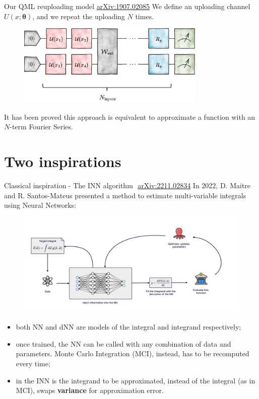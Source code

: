 \documentclass[8pt, xcolor={svgnames}, hyperref={linkcolor=black}]{beamer}
\begin{document}
\begin{frame}{Our QML reuploading model\hfill \faBook\,\,\href{https://arxiv.org/abs/1907.02085}{arXiv:1907.02085}}
We define an uploading channel $U(x; \bm{\theta})$, and we repeat the uploading 
$N$ times.
\pause 

\begin{figure}  
    \includegraphics[width=0.8\textwidth]{figures/4dim.png}
\end{figure}
\pause
It has been proved this approach is equivalent to approximate a function with an 
$N$-term Fourier Series.
\end{frame}
 

\section{Two inspirations}

\begin{frame}{Classical inspiration - The INN algorithm \hfill \faBook\,\,\href{https://arxiv.org/abs/2211.02834}{arXiv:2211.02834}}
In 2022, D. Maitre and R. Santos-Mateus presented a method to estimate multi-variable integrals using 
Neural Networks:
\vspace{-0.28cm}
\pause
\begin{figure}
    \includegraphics[width=1\textwidth]{figures/INN.pdf}
\end{figure}
\pause
\begin{itemize}[noitemsep]
\item[\tiny\faSquare] both NN and dNN are models of the integral and integrand respectively;
\pause
\item[\tiny\faSquare] once trained, the NN can be called with any
combination of data and parameters. Monte Carlo Integration (MCI), instead, 
has to be recomputed every time;
\pause
\item[\tiny\faSquare] in the INN is the integrand to be approximated, instead of 
the integral (as in MCI), swaps \textbf{variance} for approximation error.
\end{itemize}
\end{frame}
\end{document}
